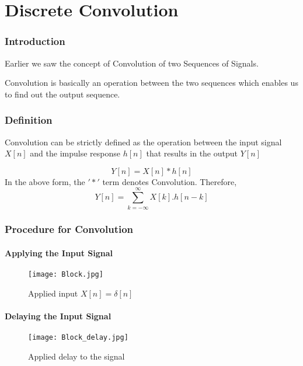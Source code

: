 \pagebreak
\chapter{Discrete Convolution}

\setcounter{section}{0}

\subsection{Introduction}

Earlier we saw the concept of Convolution of two Sequences of Signals. 

Convolution is basically an operation between the two sequences which enables us to find out the output sequence. 

\subsection{Definition}
Convolution can be strictly defined as the operation between the input signal $X[n]$ and the impulse response $h[n]$ that results in the output $Y[n]$

$$Y[n]=X[n]*h[n]$$
In the above form, the $'*'$ term denotes Convolution. 
Therefore, $$Y[n]=\sum_{k=-\infty}^{\infty} X[k].h[n-k]$$



\subsection{Procedure for Convolution}
\subsubsection{Applying the Input Signal}

\begin{figure}[ht]
\centering
\texttt{[image: Block.jpg]}
\caption{\label{Step 1:} Applied input $X[n]=\delta[n]$}
\end{figure}


\subsubsection{Delaying the Input Signal}

\begin{figure}[ht]
\centering
\texttt{[image: Block\_delay.jpg]}
\caption{\label{Step 2:} Applied delay to the signal}
\end{figure}
\pagebreak



